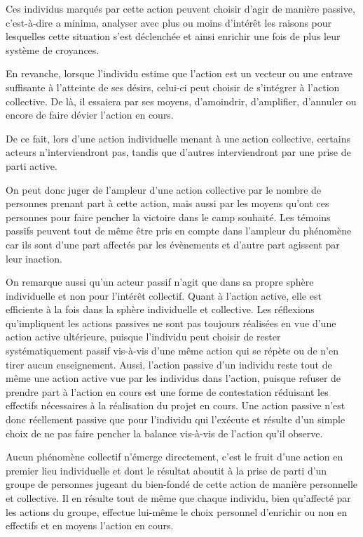 Ces individus marqués par cette action peuvent choisir d’agir de manière passive, c’est-à-dire a minima, analyser avec plus ou moins d’intérêt les raisons pour lesquelles cette situation s’est déclenchée et ainsi enrichir une fois de plus leur système de croyances.

En revanche, lorsque l’individu estime que l’action est un vecteur ou une entrave suffisante à l’atteinte de ses désirs, celui-ci peut choisir de s’intégrer à l’action collective. De là, il essaiera par ses moyens, d’amoindrir, d’amplifier, d’annuler ou encore de faire dévier l’action en cours.

De ce fait, lors d’une action individuelle menant à une action collective, certains acteurs n’interviendront pas, tandis que d’autres interviendront par une prise de parti active.

On peut donc juger de l’ampleur d’une action collective par le nombre de personnes prenant part à cette action, mais aussi par les moyens qu’ont ces personnes pour faire pencher la victoire dans le camp souhaité. Les témoins passifs peuvent tout de même être pris en compte dans l’ampleur du phénomène car ils sont d’une part affectés par les évènements et d’autre part agissent par leur inaction.

On remarque aussi qu’un acteur passif n’agit que dans sa propre sphère individuelle et non pour l'intérêt collectif. Quant à l’action active, elle est efficiente à la fois dans la sphère individuelle et collective. Les réflexions qu’impliquent les actions passives ne sont pas toujours réalisées en vue d’une action active ultérieure, puisque l’individu peut choisir de rester systématiquement passif vis-à-vis d’une même action qui se répète ou de n'en tirer aucun enseignement. Aussi, l'action passive d’un individu reste tout de même une action active vue par les individus dans l’action, puisque refuser de prendre part à l'action en cours est une forme de contestation réduisant les effectifs nécessaires à la réalisation du projet en cours. Une action passive n’est donc réellement passive que pour l’individu qui l’exécute et résulte d’un simple choix de ne pas faire pencher la balance vis-à-vis de l’action qu’il observe.

Aucun phénomène collectif n’émerge directement, c'est le fruit d’une action en premier lieu individuelle et dont le résultat aboutit à la prise de parti d’un groupe de personnes jugeant du bien-fondé de cette action de manière personnelle et collective. Il en résulte tout de même que chaque individu, bien qu’affecté par les actions du groupe, effectue lui-même le choix personnel d’enrichir ou non en effectifs et en moyens l’action en cours.

